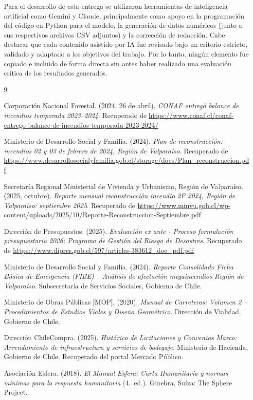\documentclass[letterpaper]{article}
\begin{document}
\begin{flushleft}
Para el desarrollo de esta entrega se utilizaron herramientas de inteligencia artificial como Gemini y Claude, principalmente como apoyo en la programaci\'on del c\'odigo en Python para el modelo, la generaci\'on de datos num\'ericos (junto a sus respectivos archivos CSV adjuntos) y la correcci\'on de redacci\'on. Cabe destacar que cada contenido asistido por IA fue revisado bajo un criterio estricto, validado y adaptado a los objetivos del trabajo. Por lo tanto, ning\'un elemento fue copiado e incluido de forma directa sin antes haber realizado una evaluaci\'on cr\'itica de los resultados generados.

\newpage
\begin{thebibliography}{9}

Corporaci\'on Nacional Forestal. (2024, 26 de abril). \textit{CONAF entreg\'o balance de incendios temporada 2023--2024}. Recuperado de \url{https://www.conaf.cl/conaf-entrego-balance-de-incendios-temporada-2023-2024/}

Ministerio de Desarrollo Social y Familia. (2024). \textit{Plan de reconstrucci\'on: incendios 02 y 03 de febrero de 2024, Regi\'on de Valpara\'iso}. Recuperado de \url{https://www.desarrollosocialyfamilia.gob.cl/storage/docs/Plan_reconstruccion.pdf}

Secretar\'ia Regional Ministerial de Vivienda y Urbanismo, Regi\'on de Valpara\'iso. (2025, octubre). \textit{Reporte mensual reconstrucci\'on incendio 2F 2024, Regi\'on de Valpara\'iso: septiembre 2025}. Recuperado de \url{https://www.minvu.gob.cl/wp-content/uploads/2025/10/Reporte-Reconstruccion-Septiembre.pdf}

Direcci\'on de Presupuestos. (2025). \textit{Evaluaci\'on ex ante - Proceso formulaci\'on presupuestaria 2026: Programa de Gesti\'on del Riesgo de Desastres}. Recuperado de \url{https://www.dipres.gob.cl/597/articles-383612_doc_pdf.pdf}

Ministerio de Desarrollo Social y Familia. (2024). \textit{Reporte Consolidado Ficha B\'asica de Emergencia (FIBE) -- An\'alisis de afectaci\'on megaincendios Regi\'on de Valpara\'iso}. Subsecretar\'ia de Servicios Sociales, Gobierno de Chile.

Ministerio de Obras P\'ublicas [MOP]. (2020). \textit{Manual de Carreteras: Volumen 2 -- Procedimientos de Estudios Viales y Dise\~no Geom\'etrico}. Direcci\'on de Vialidad, Gobierno de Chile.

Direcci\'on ChileCompra. (2025). \textit{Hist\'orico de Licitaciones y Convenios Marco: Arrendamiento de infraestructura y servicios de bodegaje}. Ministerio de Hacienda, Gobierno de Chile. Recuperado del portal Mercado P\'ublico.

Asociaci\'on Esfera. (2018). \textit{El Manual Esfera: Carta Humanitaria y normas m\'inimas para la respuesta humanitaria} (4.\textordfeminine\ ed.). Ginebra, Su\'iza: The Sphere Project.

\end{thebibliography}

\end{flushleft}
\end{document}
